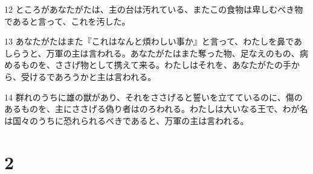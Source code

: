 \par 12 ところがあなたがたは、主の台は汚れている、またこの食物は卑しむべき物であると言って、これを汚した。
\par 13 あなたがたはまた『これはなんと煩わしい事か』と言って、わたしを鼻であしらうと、万軍の主は言われる。あなたがたはまた奪った物、足なえのもの、病めるものを、ささげ物として携えて来る。わたしはそれを、あなたがたの手から、受けるであろうかと主は言われる。
\par 14 群れのうちに雄の獣があり、それをささげると誓いを立てているのに、傷のあるものを、主にささげる偽り者はのろわれる。わたしは大いなる王で、わが名は国々のうちに恐れられるべきであると、万軍の主は言われる。

\chapter{2}


